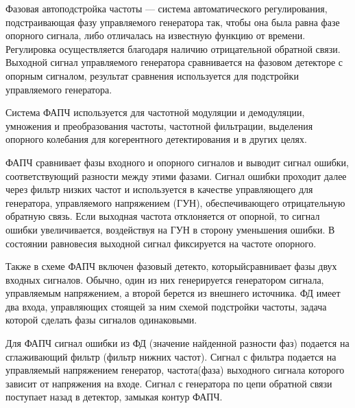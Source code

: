 \documentclass[10pt,a4paper]{article}
\begin{document}
Фазовая автоподстройка частоты — система автоматического регулирования, подстраивающая фазу управляемого генератора так, чтобы она была равна фазе опорного сигнала, либо отличалась на известную функцию от времени. Регулировка осуществляется благодаря наличию отрицательной обратной связи. Выходной сигнал управляемого генератора сравнивается на фазовом детекторе с опорным сигналом, результат сравнения используется для подстройки управляемого генератора.

Система ФАПЧ используется для частотной модуляции и демодуляции, умножения и преобразования частоты, частотной фильтрации, выделения опорного колебания для когерентного детектирования и в других целях.

ФАПЧ сравнивает фазы входного и опорного сигналов и выводит сигнал ошибки, соответствующий разности между этими фазами. Сигнал ошибки проходит далее через фильтр низких частот и используется в качестве управляющего для генератора, управляемого напряжением (ГУН), обеспечивающего отрицательную обратную связь. Если выходная частота отклоняется от опорной, то сигнал ошибки увеличивается, воздействуя на ГУН в сторону уменьшения ошибки. В состоянии равновесия выходной сигнал фиксируется на частоте опорного.

Также в схеме ФАПЧ включен фазовый детекто, которыйсравнивает фазы двух входных сигналов. Обычно, один из них генерируется генератором сигнала, управляемым напряжением, а второй берется из внешнего источника. ФД имеет два входа, управляющих стоящей за ним схемой подстройки частоты, задача которой сделать фазы сигналов одинаковыми.

Для ФАПЧ сигнал ошибки из ФД (значение найденной разности фаз) подается на сглаживающий фильтр (фильтр нижних частот). Сигнал с фильтра подается на управляемый напряжением генератор, частота(фаза) выходного сигнала которого зависит от напряжения на входе. Сигнал с генератора по цепи обратной связи поступает назад в детектор, замыкая контур ФАПЧ.
\end{document}
